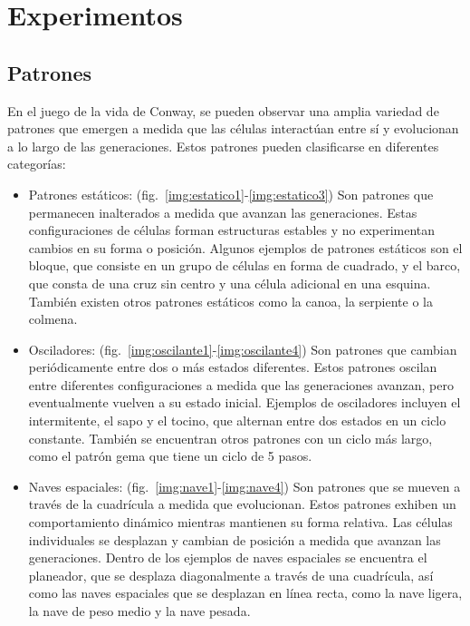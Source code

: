 \documentclass[12pt]{article}
\begin{document}
\section{Experimentos}


\subsection*{Patrones}

En el juego de la vida de Conway, se pueden observar una amplia variedad de patrones que emergen a medida que las células interactúan entre sí y evolucionan a lo largo de las generaciones. Estos patrones pueden clasificarse en diferentes categorías:

\begin{itemize}
  \item Patrones estáticos: (fig.~\ref{img:estatico1}-\ref{img:estatico3}) Son patrones que permanecen inalterados a medida que avanzan las generaciones. Estas configuraciones de células forman estructuras estables y no experimentan cambios en su forma o posición. Algunos ejemplos de patrones estáticos son el bloque, que consiste en un grupo de células en forma de cuadrado, y el barco, que consta de una cruz sin centro y una célula adicional en una esquina. También existen otros patrones estáticos como la canoa, la serpiente o la colmena.

  \item Osciladores: (fig.~\ref{img:oscilante1}-\ref{img:oscilante4}) Son patrones que cambian periódicamente entre dos o más estados diferentes. Estos patrones oscilan entre diferentes configuraciones a medida que las generaciones avanzan, pero eventualmente vuelven a su estado inicial. Ejemplos de osciladores incluyen el intermitente, el sapo y el tocino, que alternan entre dos estados en un ciclo constante. También se encuentran otros patrones con un ciclo más largo, como el patrón gema que tiene un ciclo de 5 pasos.

  \item Naves espaciales: (fig.~\ref{img:nave1}-\ref{img:nave4}) Son patrones que se mueven a través de la cuadrícula a medida que evolucionan. Estos patrones exhiben un comportamiento dinámico mientras mantienen su forma relativa. Las células individuales se desplazan y cambian de posición a medida que avanzan las generaciones. Dentro de los ejemplos de naves espaciales se encuentra el planeador, que se desplaza diagonalmente a través de una cuadrícula, así como las naves espaciales que se desplazan en línea recta, como la nave ligera, la nave de peso medio y la nave pesada.
\end{itemize}
\end{document}
